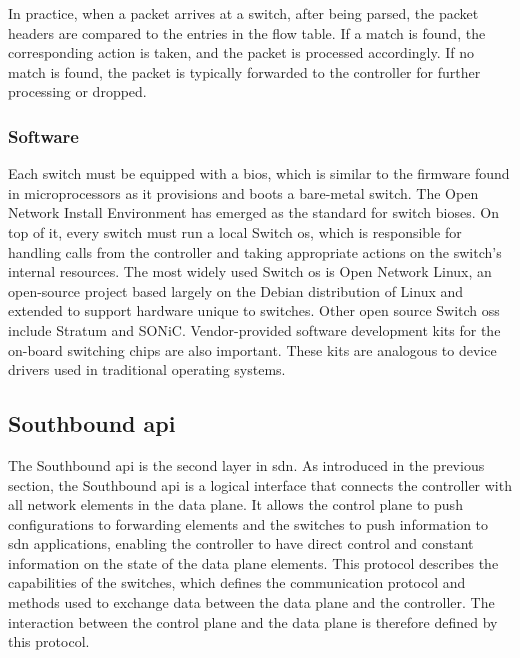 In practice, when a packet arrives at a switch, after being parsed, the packet headers are compared to the entries in the flow table. If a match is found, the corresponding action is taken, and the packet is processed accordingly. If no match is found, the packet is typically forwarded to the controller for further processing or dropped.

\subsubsection{Software}

Each switch must be equipped with a \gls{bios}, which is similar to the firmware found in microprocessors as it provisions and boots a bare-metal switch. The Open Network Install Environment has emerged as the standard for switch \gls{bios}es\cite{peterson_software-defined_2021}. On top of it, every switch must run a local Switch \gls{os}, which is responsible for handling calls from the controller and taking appropriate actions on the switch's internal resources. The most widely used Switch \gls{os} is Open Network Linux\cite{noauthor_linux_nodate}, an open-source project based largely on the Debian distribution of Linux and extended to support hardware unique to switches\cite{peterson_software-defined_2021}. Other open source Switch \glspl{os} include Stratum\cite{noauthor_stratum_nodate} and SONiC\cite{noauthor_sonic_nodate}. Vendor-provided software development kits for the on-board switching chips are also important. These kits are analogous to device drivers used in traditional operating systems. 


\subsection[Southbound API]{Southbound \gls{api}} %

The Southbound \gls{api} is the second layer in \gls{sdn}. As introduced in the previous section, the Southbound \gls{api} is a logical interface that connects the controller with all network elements in the data plane\cite{thyagaturu_software_2016}. It allows the control plane to push configurations to forwarding elements and the switches to push information to \gls{sdn} applications, enabling the controller to have direct control and constant information on the state of the data plane elements. 
This protocol describes the capabilities of the switches, which defines the communication protocol and methods used to exchange data between the data plane and the controller. The interaction between the control plane and the data plane is therefore defined by this protocol\cite{kreutz_software-defined_2015}. 

